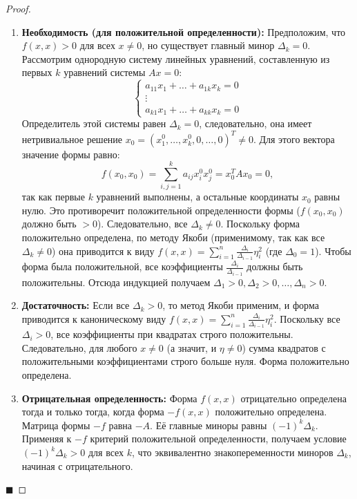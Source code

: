 \begin{proof}
\begin{enumerate}
    \item \textbf{Необходимость (для положительной определенности):} 
    Предположим, что $f(x, x) > 0$ для всех $x \neq 0$, но существует главный минор $\Delta_k = 0$. Рассмотрим однородную систему линейных уравнений, составленную из первых $k$ уравнений системы $Ax = 0$:
    \[
    \begin{cases}
    a_{11}x_1 + \dots + a_{1k}x_k = 0 \\
    \vdots \\
    a_{k1}x_1 + \dots + a_{kk}x_k = 0
    \end{cases}
    \]
    Определитель этой системы равен $\Delta_k = 0$, следовательно, она имеет нетривиальное решение $x_0 = (x_1^0, \dots, x_k^0, 0, \dots, 0)^T \neq 0$. 
    Для этого вектора значение формы равно:
    \[
    f(x_0, x_0) = \sum_{i,j=1}^k a_{ij} x_i^0 x_j^0 = x_0^T A x_0 = 0,
    \]
    так как первые $k$ уравнений выполнены, а остальные координаты $x_0$ равны нулю. Это противоречит положительной определенности формы ($f(x_0, x_0)$ должно быть $>0$). 
    Следовательно, все $\Delta_k \neq 0$. Поскольку форма положительно определена, по методу Якоби (применимому, так как все $\Delta_k \neq 0$) она приводится к виду $f(x, x) = \sum_{i=1}^n \frac{\Delta_i}{\Delta_{i-1}} \eta_i^2$ (где $\Delta_0 = 1$). Чтобы форма была положительной, все коэффициенты $\frac{\Delta_i}{\Delta_{i-1}}$ должны быть положительны. Отсюда индукцией получаем $\Delta_1 > 0, \Delta_2 > 0, \dots, \Delta_n > 0$.

    \item \textbf{Достаточность:} 
    Если все $\Delta_k > 0$, то метод Якоби применим, и форма приводится к каноническому виду $f(x, x) = \sum_{i=1}^n \frac{\Delta_i}{\Delta_{i-1}} \eta_i^2$. Поскольку все $\Delta_i > 0$, все коэффициенты при квадратах строго положительны. Следовательно, для любого $x \neq 0$ (а значит, и $\eta \neq 0$) сумма квадратов с положительными коэффициентами строго больше нуля. Форма положительно определена.

    \item \textbf{Отрицательная определенность:} 
    Форма $f(x, x)$ отрицательно определена тогда и только тогда, когда форма $-f(x, x)$ положительно определена. Матрица формы $-f$ равна $-A$. Её главные миноры равны $(-1)^k \Delta_k$. Применяя к $-f$ критерий положительной определенности, получаем условие $(-1)^k \Delta_k > 0$ для всех $k$, что эквивалентно знакопеременности миноров $\Delta_k$, начиная с отрицательного.
\end{enumerate}
\hfill$\blacksquare$
\end{proof}
